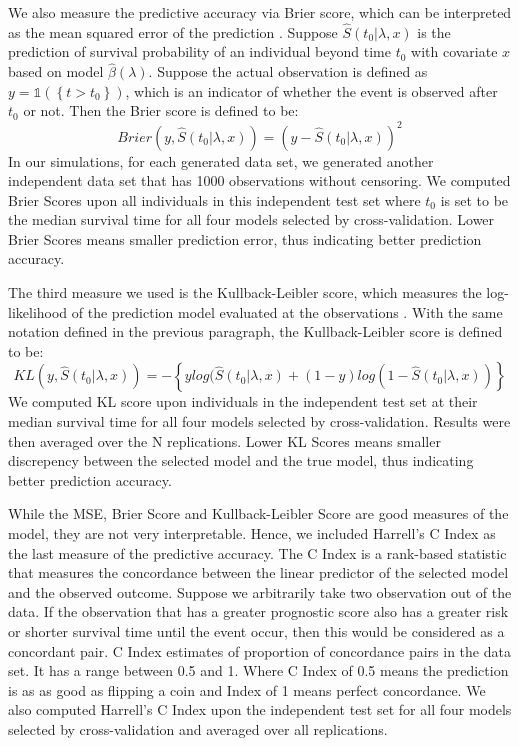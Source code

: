 \par We also measure the predictive accuracy via Brier score, which can be interpreted as the mean squared error of the prediction \citep{VanHouwelingen2011}. Suppose $\hat{S}(t_0|\lambda,x)$ is the prediction of survival probability of an individual beyond time $t_0$ with covariate $x$ based on model $\hat{\beta}(\lambda)$. Suppose the actual observation is defined as $y = \mathbb{1}(\left\{ t > t_{0}\right\})$, which is an indicator of whether the event is observed after $t_0$ or not. Then the Brier score is defined to be:
\begin{equation}
	Brier(y, \hat{S}(t_0|\lambda,x)) = (y - \hat{S}(t_0|\lambda,x))^2
\end{equation}
In our simulations, for each generated data set, we generated another independent data set that has 1000 observations without censoring. We computed Brier Scores upon all individuals in this independent test set where $t_0$ is set to be the median survival time for all four models selected by cross-validation. Lower Brier Scores means smaller prediction error, thus indicating better prediction accuracy.

\par The third measure we used is the Kullback-Leibler score, which measures the log-likelihood of the prediction model evaluated at the observations \citep{VanHouwelingen2011}. With the same notation defined in the previous paragraph, the Kullback-Leibler score is defined to be:
\begin{equation}
	KL(y, \hat{S}(t_0|\lambda,x)) = -\left\{ ylog(\hat{S}(t_0|\lambda,x) + (1 - y)log(1 - \hat{S}(t_0|\lambda,x)) \right\}
\end{equation}
We computed KL score upon individuals in the independent test set at their median survival time for all four models selected by cross-validation. Results were then averaged over the N replications. Lower KL Scores means smaller discrepency between the selected model and the true model, thus indicating better prediction accuracy.

\par While the MSE, Brier Score and Kullback-Leibler Score are good measures of the model, they are not very interpretable. Hence, we included Harrell's C Index as the last measure of the predictive accuracy\citep{HarrellJr1984}. The C Index is a rank-based statistic that measures the concordance between the linear predictor of the selected model and the observed outcome. Suppose we arbitrarily take two observation out of the data. If the observation that has a greater prognostic score also has a greater risk or shorter survival time until the event occur, then this would be considered as a concordant pair. C Index estimates of proportion of concordance pairs in the data set. It has a range between 0.5 and 1. Where C Index of 0.5 means the prediction is as as good as flipping a coin and Index of 1 means perfect concordance. We also computed Harrell's C Index upon the independent test set for all four models selected by cross-validation and averaged over all replications.

